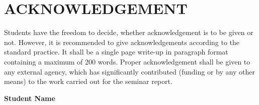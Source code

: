 
\chapter*{\centering \textbf{\MakeUppercase{ACKNOWLEDGEMENT}}}
Students have the freedom to decide, whether acknowledgement is to be given or 
not.  However, it is recommended to give acknowledgements according to the 
standard practice. 
It shall be a single page write-up in paragraph format containing a maximum of 
200 words. 
Proper acknowledgement shall be given to any external agency, which has 
significantly contributed (funding or by any other means) to the work carried out 
for the seminar report. 

\begin{FlushRight}
\hfill \textbf{Student Name}\\[0.001cm]

\end{FlushRight}




\newpage

